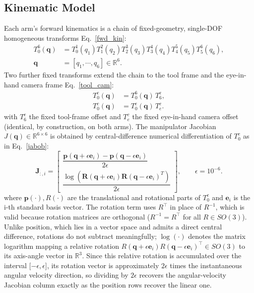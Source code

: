 \documentclass[letterpaper, 10 pt, conference]{ieeeconf}  %
\begin{document}
\subsection{Kinematic Model}
\label{kin_model}
Each arm's forward kinematics is a chain of fixed-geometry, single-DOF homogeneous
transforms Eq.~\ref{fwd_kin}:
\begin{equation}
\begin{aligned}
T_{0}^{6}(\mathbf{q}) &=
T_{0}^{1}(q_{1})
T_{1}^{2}(q_{2})
T_{2}^{3}(q_{3})
T_{3}^{4}(q_{4})
T_{4}^{5}(q_{5})
T_{5}^{6}(q_{6}), \\
\mathbf{q} &= [q_{1}, \cdots, q_{6}] \in \mathbb{R}^{6}.
\end{aligned}
\label{fwd_kin}
\end{equation}
Two further fixed transforms extend the chain to the tool frame and the eye-in-hand
camera frame Eq.~\ref{tool_cam}:
\begin{equation}
\begin{aligned}
T_{0}^{e}(\mathbf{q}) &= T_{0}^{6}(\mathbf{q})\,T_{6}^{e}, \\
T_{0}^{c}(\mathbf{q}) &= T_{0}^{e}(\mathbf{q})\,T_{e}^{c}.
\end{aligned}
\label{tool_cam}
\end{equation}
with $T_6^{e}$ the fixed tool-frame offset and $T_e^{c}$ the fixed eye-in-hand camera offset (identical, by construction, on both arms). The manipulator Jacobian $J(\mathbf q)\in\mathbb R^{6\times 6}$ is obtained by central-difference numerical differentiation of $T_0^{e}$ as in Eq.~\ref{jabob}:
\begin{equation}
\mathbf{J}_{:,i}=
\begin{bmatrix}
\dfrac{\mathbf{p}(\mathbf{q}+\epsilon\mathbf{e}_{i})-
\mathbf{p}(\mathbf{q}-\epsilon\mathbf{e}_{i})}{2\epsilon} \\[1.2ex]
\dfrac{\log\!\left(
\mathbf{R}(\mathbf{q}+\epsilon\mathbf{e}_{i})
\mathbf{R}(\mathbf{q}-\epsilon\mathbf{e}_{i})^{T}
\right)}{2\epsilon}
\end{bmatrix},
\qquad
\epsilon=10^{-6}.
\label{jabob}
\end{equation}
where $\mathbf p(\cdot),R(\cdot)$ are the translational and rotational parts of $T_0^{e}$ and $\mathbf e_i$ is the i-th standard basis vector. The rotation term uses $R^\top$ in place of $R^{-1}$, which is valid because rotation matrices are orthogonal ($R^{-1}=R^\top$ for all $R\in SO(3)$). Unlike position, which lies in a vector space and admits a direct central difference, rotations do not subtract
meaningfully; $\log(\cdot)$ denotes the matrix logarithm mapping a relative rotation $R(\mathbf q+\epsilon\mathbf e_i)R(\mathbf q-\epsilon\mathbf e_i)^\top\in SO(3)$ to its axis-angle vector in $\mathbb R^3$. Since this relative rotation is accumulated over the interval [$-\epsilon,\epsilon$], its rotation vector is approximately $2\epsilon$ times the instantaneous angular velocity direction, so dividing by $2\epsilon$ recovers the angular-velocity Jacobian column exactly as the position rows recover the linear one.
\end{document}
